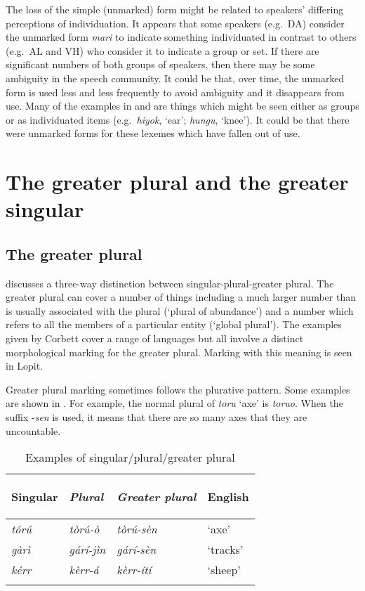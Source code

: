 \documentclass[output=paper]{langsci/langscibook}
\begin{document}
The loss of the simple (unmarked) form might be related to speakers’ differing perceptions of individuation. It appears that some speakers (e.g.\ DA) consider the unmarked form \textit{mari }to indicate something individuated in contrast to others (e.g.\ AL and VH) who consider it to indicate a group or set. If there are significant numbers of both groups of speakers, then there may be some ambiguity in the speech community. It could be that, over time, the unmarked form is used less and less frequently to avoid ambiguity and it disappears from use. Many of the examples in  and  are things which might be seen either as groups or as individuated items (e.g.\ \textit{hiyok}, ‘ear’; \textit{hungu}, ‘knee’). It could be that there were unmarked forms for these lexemes which have fallen out of use.

\section{The greater plural and the greater singular} \label{sec:moodie:5}


\subsection{The greater plural} \label{sec:moodie:5.1}

\citet[30]{Corbett2000} discusses a three-way distinction between singular-plural-greater plural. The greater plural can cover a number of things including a much larger number than is usually associated with the plural (‘plural of abundance’) and a number which refers to all the members of a particular entity (‘global plural’). The examples given by Corbett cover a range of languages but all involve a distinct morphological marking for the greater plural. Marking with this meaning is seen in Lopit. 

Greater plural marking sometimes follows the plurative pattern. Some examples are shown in . For example, the normal plural of \textit{toru} ‘axe’ is \textit{toruo}. When the suffix -\textit{sen }is used, it means that there are so many axes that they are uncountable.

\begin{table}
\begin{tabularx}{\textwidth}{>{\itshape}X>{\itshape}X>{\itshape}XX}
\lsptoprule

 \textup{Singular} & \textup{Plural} & \textup{Greater plural} & {English}\\ \midrule
 tórú &  tòrú-ò &  tòrú-sèn &  ‘axe’\\
 gàrì &  gárí-jìn &  gárí-sèn &  ‘tracks’\\
 kérr &  kèrr-á &  kèrr-ítí &  ‘sheep’\\
\lspbottomrule
\end{tabularx}
\caption{Examples of singular/plural/greater plural}
\label{tab:moodie:17}
\end{table}
\end{document}
